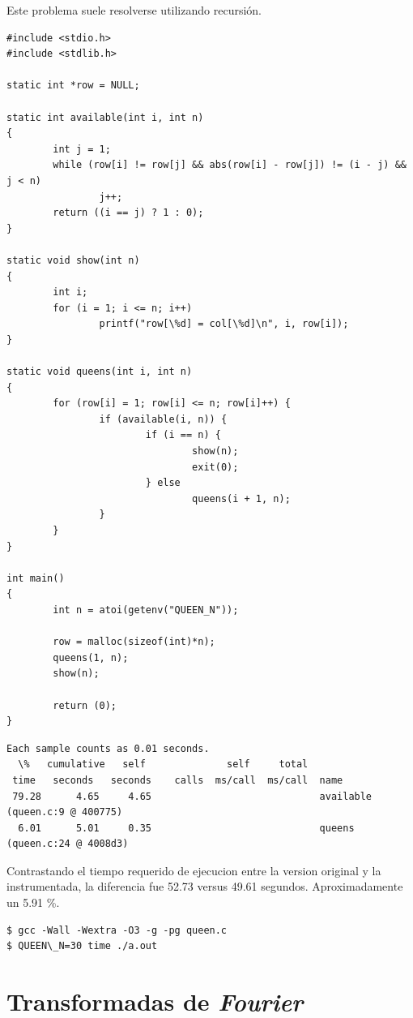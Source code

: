 \documentclass[a4paper]{report}
\begin{document}
\bigskip

Este problema suele resolverse utilizando recursi\'on.

\begin{verbatim}
#include <stdio.h>
#include <stdlib.h>

static int *row = NULL;

static int available(int i, int n)
{
        int j = 1;
        while (row[i] != row[j] && abs(row[i] - row[j]) != (i - j) && j < n)
                j++;
        return ((i == j) ? 1 : 0);
}

static void show(int n)
{
        int i;
        for (i = 1; i <= n; i++)
                printf("row[\%d] = col[\%d]\n", i, row[i]);
}

static void queens(int i, int n)
{
        for (row[i] = 1; row[i] <= n; row[i]++) {
                if (available(i, n)) {
                        if (i == n) {
                                show(n);
                                exit(0);
                        } else
                                queens(i + 1, n);
                }
        }
}

int main()
{
        int n = atoi(getenv("QUEEN_N"));

        row = malloc(sizeof(int)*n);
        queens(1, n);
        show(n);

        return (0);
}
\end{verbatim}

\begin{verbatim}
Each sample counts as 0.01 seconds.
  \%   cumulative   self              self     total
 time   seconds   seconds    calls  ms/call  ms/call  name
 79.28      4.65     4.65                             available (queen.c:9 @ 400775)
  6.01      5.01     0.35                             queens (queen.c:24 @ 4008d3)
\end{verbatim}

Contrastando el tiempo requerido de ejecucion entre la version original y la instrumentada,
la diferencia fue 52.73 versus 49.61 segundos. Aproximadamente un 5.91 \%.

\begin{verbatim}
$ gcc -Wall -Wextra -O3 -g -pg queen.c
$ QUEEN\_N=30 time ./a.out
\end{verbatim}

\section{Transformadas de {\it Fourier}}
\end{document}

